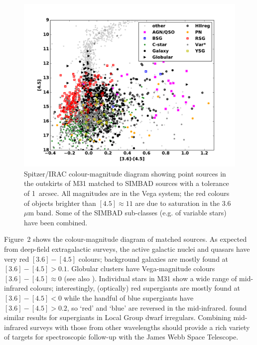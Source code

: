 \documentclass{iau}
\begin{document}
\begin{figure}[t]
\begin{center}
 \includegraphics[width=4.5in]{barmby_iaus321_fig2} 
 \caption{Spitzer/IRAC colour-magnitude diagram showing point sources in the outskirts of M31 matched to SIMBAD
 sources with a tolerance of 1~arcsec. All magnitudes are in the Vega system; the red colours of objects brighter than
 $[4.5]\approx 11$ are due to saturation in the 3.6~$\mu$m band. Some of the SIMBAD sub-classes (e.g. of variable stars)
have been combined.}
   \label{fig2}
\end{center}
\end{figure}

Figure~2 shows the colour-magnitude diagram of matched sources. As expected from deep-field extragalactic surveys,
the active galactic nuclei and quasars have very red $[3.6]-[4.5]$ colours; background galaxies are mostly found at $[3.6]-[4.5]>0.1$.
Globular clusters have Vega-magnitude colours  $[3.6]-[4.5]\approx 0$ (see also \cite[Barmby \& Jalilian 2012]{bj12}).
Individual stars in M31 show a wide range of mid-infrared colours; interestingly, (optically) red supergiants are mostly found at $[3.6]-[4.5]<0$
while the handful of blue supergiants have $[3.6]-[4.5]>0.2$, so `red' and `blue' are reversed in the mid-infrared.
\cite[Britavskiy \etal\ (2015)]{brit15} found similar results for supergiants in Local Group dwarf irregulars.
Combining mid-infrared surveys with those from other wavelengths should provide a rich variety of targets for spectroscopic follow-up
with the James Webb Space Telescope.  
 
\end{document}
